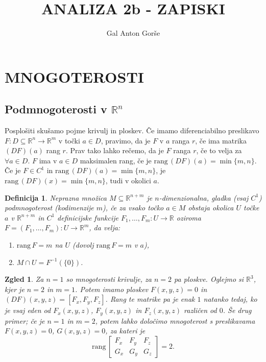 \documentclass[10pt, a4paper]{article}
\newtheorem{defi}{Definicija}[section]
\newenvironment{noticeB}{%
  \tcolorbox[%
  notitle,
  empty,
  enhanced,  %
  breakable,
  coltext=black,
  colback=white, 
  fontupper=\rmfamily,
  parbox=false,
  noparskip,
  sharp corners,
  boxrule=-1pt,  %
  frame hidden,
  left=7pt,  %
  right=7pt,
  top=5pt,
  bottom=5pt,
  before skip=2.5ex plus 2pt,
  after skip=2.5ex plus 2pt,
  borderline west = {1.5pt}{-0.1pt}{blue!30!black}, %
  overlay unbroken and last={%
    \draw[color=black, line width=1.25pt]
    ($(frame.south west)+(1.pt, -0.1pt)$) -- ++(2em, 0);
  }
  ]}
{\endtcolorbox}
\newenvironment{definicija}{\begin{defi}\begin{noticeB}}{%
    \end{noticeB}\end{defi}}
\newtheorem{zgled}{Zgled}[section]
\newcommand{\R}{\mathbb {R}}
\newcommand{\rang}{\mathrm{\text{rang}}\,}
\begin{document}
\title{ANALIZA 2b - ZAPISKI}
\author{Gal Anton Gorše}
\date{}
\maketitle

\section{MNOGOTEROSTI}

\subsection{Podmnogoterosti v $\R^n$}

Posplošiti skušamo pojme krivulj in ploskev. Če imamo diferenciabilno preslikavo
$F : D \subseteq \R^n \to \R^m$ v točki $a \in D$, pravimo, da je $F$ v $a$ ranga $r$,
če ima matrika $(DF) (a)$ rang $r$. Prav tako lahko rečemo, da je $F$ ranga $r$, če to velja za $\forall a \in D$.
$F$ ima v $a \in D$ maksimalen rang, če je $\rang (DF) (a) = \min \{m, n\}$.
Če je $F \in C^1$ in $\rang (DF) (a) = \min\{m, n\}$, je $\rang (DF) (x) = \min \{m, n\}$, tudi v okolici $a$.

\begin{definicija}
    Neprazna množica $M \subseteq \R^{n + m}$ je $n$-dimenzionalna, gladka (vsaj $C^1$)
    podmnogoterost (kodimenzije $m$), če za vsako točko $a \in M$ obstaja okolica $U$
    točke $a$ v $\R^{n + m}$ in $C^1$ definicijske funkcije $F_1, \dots, F_{m}: U \to \R$ oziroma
    $F = (F_1, \dots, F_m) : U \to \R^m$, da velja:
    \begin{enumerate}
        \item $\rang F = m$ na $U$ (dovolj $\rang F = m$ v $a$),
        \item $M \cap U = F^{-1} (\{0\})$.
    \end{enumerate}
\end{definicija}

\begin{zgled}
    Za $n = 1$ so mnogoterosti krivulje, za $n = 2$ pa ploskve.
    Oglejmo si $\R^3$, kjer je $n = 2$ in $m = 1$. Potem imamo ploskev $F(x, y, z) = 0$
    in $(DF) (x, y, z) = [F_x, F_y, F_z]$. Rang te matrike pa je enak $1$ natanko tedaj, ko 
    je vsaj eden od $F_x (x, y, z)$, $F_y (x, y, z)$ in $F_z (x, y, z)$ različen od $0$.
    Še drug primer; če je $n = 1$ in $m = 2$,
    potem lahko določimo mnogoterost s preslikavama 
    $F (x, y, z) = 0$, $G(x, y, z) = 0$, za kateri je 
    $$\rang \begin{bmatrix}
        F_x & F_y & F_z\\
        G_x & G_y & G_z
    \end{bmatrix} = 2.$$
\end{zgled}
\end{document}

